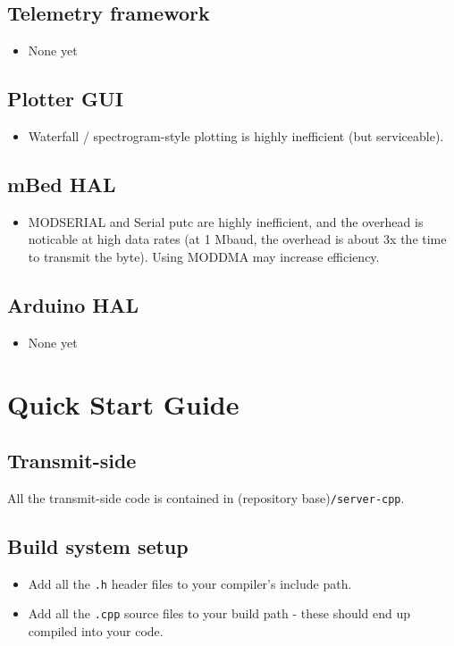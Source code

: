 \documentclass[11pt]{article}
\begin{document}
\subsection{Telemetry framework}
\begin{itemize}
  \item None yet
\end{itemize}

\subsection{Plotter GUI}
\begin{itemize}
  \item Waterfall / spectrogram-style plotting is highly inefficient (but serviceable).
\end{itemize}

\subsection{mBed HAL}
\begin{itemize}
  \item MODSERIAL and Serial putc are highly inefficient, and the overhead is noticable at high data rates (at 1 Mbaud, the overhead is about 3x the time to transmit the byte). Using MODDMA may increase efficiency.
\end{itemize}

\subsection{Arduino HAL}
\begin{itemize}
  \item None yet
\end{itemize}

\section{Quick Start Guide}
\subsection{Transmit-side}
All the transmit-side code is contained in (repository base)\texttt{/server-cpp}.
\subsection{Build system setup}
\begin{itemize}
  \item Add all the \texttt{.h} header files to your compiler's include path.
  \item Add all the \texttt{.cpp} source files to your build path - these should end up compiled into your code.
\end{itemize}
\end{document}
